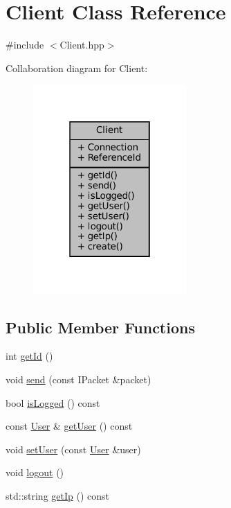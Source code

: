 \hypertarget{classClient}{}\section{Client Class Reference}
\label{classClient}


{\ttfamily \#include $<$Client.\+hpp$>$}



Collaboration diagram for Client\+:
\nopagebreak
\begin{figure}[H]
\begin{center}
\leavevmode
\includegraphics[width=166pt]{classClient__coll__graph}
\end{center}
\end{figure}
\subsection*{Public Member Functions}
\begin{DoxyCompactItemize}
\item 
int \mbox{\hyperlink{classClient_abc4d8d86cc753596a08a90e359f5eb31}{get\+Id}} ()
\item 
void \mbox{\hyperlink{classClient_ab26edfd53bf1deeab0aac1715858f279}{send}} (const I\+Packet \&packet)
\item 
bool \mbox{\hyperlink{classClient_afcbe6046c74e86b64c1b861f5e58ffbd}{is\+Logged}} () const
\item 
const \mbox{\hyperlink{structUser}{User}} \& \mbox{\hyperlink{classClient_a31da08b532d6585e61d98b563177e33a}{get\+User}} () const
\item 
void \mbox{\hyperlink{classClient_a902b85e55694c497acf50deb082cb23e}{set\+User}} (const \mbox{\hyperlink{structUser}{User}} \&user)
\item 
void \mbox{\hyperlink{classClient_aa977795294407c10fe843b5bc28b6685}{logout}} ()
\item 
std\+::string \mbox{\hyperlink{classClient_ab04ab042f49fd43a6eaeb8df05eb0eae}{get\+Ip}} () const
\end{DoxyCompactItemize}
